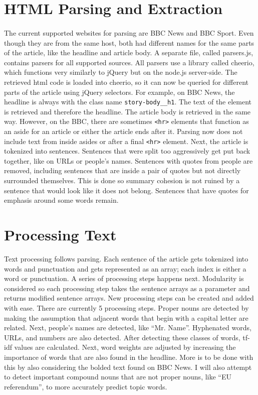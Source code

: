 \documentclass[11pt]{article}
\begin{document}
\section{HTML Parsing and Extraction}
\paragraph{}
The current supported websites for parsing are BBC News and BBC Sport. Even though they are from the same host, both had different names for the same parts of the article, like the headline and article body. A separate file, called parsers.js, contains parsers for all supported sources. All parsers use a library called cheerio, which functions very similarly to jQuery but on the node.js server-side. The retrieved html code is loaded into cheerio, so it can now be queried for different parts of the article using jQuery selectors. For example, on BBC News, the headline is always with the class name \lstinline|story-body__h1|. The text of the element is retrieved and therefore the headline. The article body is retrieved in the same way. However, on the BBC, there are sometimes \lstinline|<hr>| elements that function as an aside for an article or either the article ends after it. Parsing now does not include text from inside asides or after a final \lstinline|<hr>| element. Next, the article is tokenized into sentences. Sentences that were split too aggressively get put back together, like on URLs or people's names. Sentences with quotes from people are removed, including sentences that are inside a pair of quotes but not directly surrounded themselves. This is done so summary cohesion is not ruined by a sentence that would look like it does not belong. Sentences that have quotes for emphasis around some words remain.

\section{Processing Text}
Text processing follows parsing. Each sentence of the article gets tokenized into words and punctuation and gets represented as an array; each index is either a word or punctuation. A series of processing steps happens next. Modularity is considered so each processing step takes the sentence arrays as a parameter and returns modified sentence arrays. New processing steps can be created and added with ease. There are currently 5 processing steps. Proper nouns are detected by making the assumption that adjacent words that begin with a capital letter are related. Next, people's names are detected, like ``Mr. Name''. Hyphenated words, URLs, and numbers are also detected. After detecting these classes of words, tf-idf values are calculated. Next, word weights are adjusted by increasing the importance of words that are also found in the headline. More is to be done with this by also considering the bolded text found on BBC News. I will also attempt to detect important compound nouns that are not proper nouns, like ``EU referendum'', to more accurately predict topic words.
\end{document}

